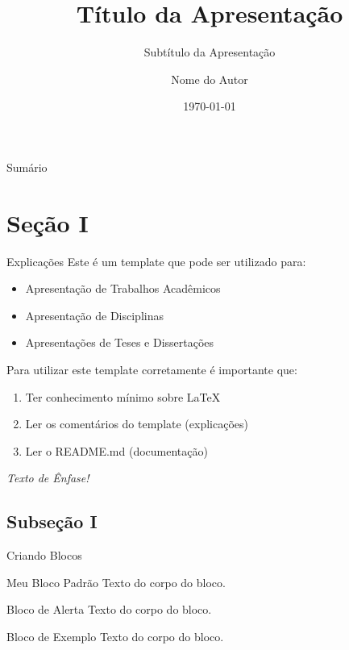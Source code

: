 \documentclass{libs/ufc_format}
\title[short title]{\textbf{Título da Apresentação}}
\subtitle{Subtítulo da Apresentação}
\author{Nome do Autor}
\institute[UFC]{
    \ufc
}
\date{\today}
\begin{document}


\begin{frame}{}
    \maketitle
\end{frame}

\begin{frame}{Sumário}
    \tableofcontents
\end{frame}

\section{Seção I}
\begin{frame}{Explicações}
    Este é um template que pode ser utilizado para:
    \begin{itemize}
        \item Apresentação de Trabalhos Acadêmicos
        \item Apresentação de Disciplinas
        \item Apresentações de Teses e Dissertações
    \end{itemize}

    \vspace{0.4cm} %
    
    Para utilizar este template corretamente é importante que:
    \begin{enumerate}
        \item Ter conhecimento mínimo sobre LaTeX
        \item Ler os comentários do template (explicações)
        \item Ler o README.md (documentação)
    \end{enumerate}

    \vspace{0.2cm}

     \emph{Texto de Ênfase!}
\end{frame}

\subsection{Subseção I}
\begin{frame}{Criando Blocos}
    \begin{block}{Meu Bloco Padrão}
        Texto do corpo do bloco.
    \end{block}

    \begin{alertblock}{Bloco de Alerta}
        Texto do corpo do bloco.
    \end{alertblock}

    \begin{exampleblock}{Bloco de Exemplo}
        Texto do corpo do bloco.
    \end{exampleblock}   
\end{frame}
\end{document}
